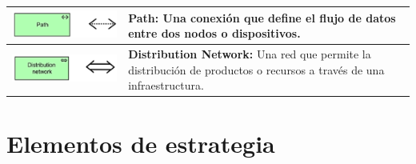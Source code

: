 \begin{longtable}{|c|p{8cm}|}
	\hline
	\includegraphics{anexos/ARCHI/technology/path.png}          &
	\textbf{Path:} Una conexión que define el flujo de datos entre dos nodos o dispositivos.                                                      \\
	\hline
	\includegraphics{anexos/ARCHI/technology/distribution.png}  &
	\textbf{Distribution Network:} Una red que permite la distribución de productos o recursos a través de una infraestructura.                   \\
	\hline
\end{longtable}

\section{Elementos de estrategia}

